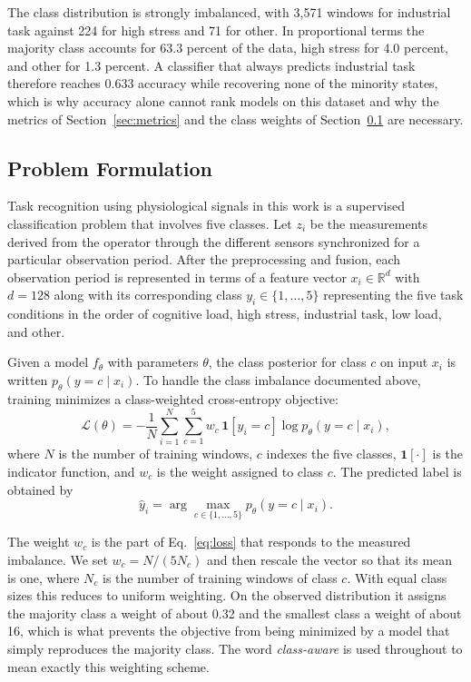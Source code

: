 \documentclass[a4paper,twoside]{article}
\begin{document}
The class distribution is strongly imbalanced, with 3{,}571 windows for industrial task against 224 for high stress and 71 for other. In proportional terms the majority class accounts for 63.3 percent of the data, high stress for 4.0 percent, and other for 1.3 percent. A classifier that always predicts industrial task therefore reaches 0.633 accuracy while recovering none of the minority states, which is why accuracy alone cannot rank models on this dataset and why the metrics of Section~\ref{sec:metrics} and the class weights of Section~\ref{sec:formulation} are necessary.

\subsection{Problem Formulation}\label{sec:formulation}

\noindent Task recognition using physiological signals in this work is a supervised classification problem that involves five classes. Let $z_i$ be the measurements derived from the operator through the different sensors synchronized for a particular observation period. After the preprocessing and fusion, each observation period is represented in terms of a feature vector $x_i \in \mathbb{R}^{d}$ with $d = 128$ along with its corresponding class $y_i \in \{1,\ldots,5\}$ representing the five task conditions in the order of cognitive load, high stress, industrial task, low load, and other.

Given a model $f_\theta$ with parameters $\theta$, the class posterior for class $c$ on input $x_i$ is written $p_\theta(y=c\mid x_i)$. To handle the class imbalance documented above, training minimizes a class-weighted cross-entropy objective:
\begin{equation}
    \mathcal{L}(\theta)= -\frac{1}{N}\sum_{i=1}^{N}\sum_{c=1}^{5} w_c\,\mathbf{1}[y_i=c] \log p_\theta(y=c\mid x_i),
    \label{eq:loss}
\end{equation}
where $N$ is the number of training windows, $c$ indexes the five classes, $\mathbf{1}[\cdot]$ is the indicator function, and $w_c$ is the weight assigned to class $c$. The predicted label is obtained by
\begin{equation}
    \hat{y}_i = \arg\max_{c\in\{1,\ldots,5\}} p_\theta(y=c\mid x_i).
    \label{eq:pred}
\end{equation}

The weight $w_c$ is the part of Eq.~\eqref{eq:loss} that responds to the measured imbalance. We set $w_c = N / (5 N_c)$ and then rescale the vector so that its mean is one, where $N_c$ is the number of training windows of class $c$. With equal class sizes this reduces to uniform weighting. On the observed distribution it assigns the majority class a weight of about 0.32 and the smallest class a weight of about 16, which is what prevents the objective from being minimized by a model that simply reproduces the majority class. The word \emph{class-aware} is used throughout to mean exactly this weighting scheme.
\end{document}
